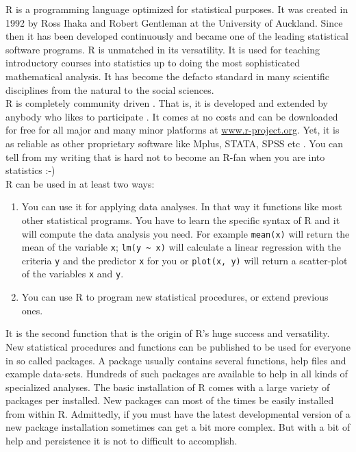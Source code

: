\documentclass[
  letterpaper,
  DIV=11,
  numbers=noendperiod]{scrreprt}
\providecommand{\tightlist}{%
  \setlength{\itemsep}{0pt}\setlength{\parskip}{0pt}}\usepackage{longtable,booktabs,array}
\begin{document}
R is a programming language optimized for statistical purposes. It was
created in 1992 by Ross Ihaka and Robert Gentleman at the University of
Auckland. Since then it has been developed continuously and became one
of the leading statistical software programs. R is unmatched in its
versatility. It is used for teaching introductory courses into
statistics up to doing the most sophisticated mathematical analysis. It
has become the defacto standard in many scientific disciplines from the
natural to the social sciences.\\
R is completely community driven . That is, it is developed and extended
by anybody who likes to participate . It comes at no costs and can be
downloaded for free for all major and many minor platforms at
\href{http://www.r-project.org}{www.r-project.org}. Yet, it is as
reliable as other proprietary software like Mplus, STATA, SPSS etc . You
can tell from my writing that is hard not to become an R-fan when you
are into statistics :-)\\
R can be used in at least two ways:

\begin{enumerate}
\def\labelenumi{\arabic{enumi}.}
\tightlist
\item
  You can use it for applying data analyses. In that way it functions
  like most other statistical programs. You have to learn the specific
  syntax of R and it will compute the data analysis you need. For
  example \texttt{mean(x)} will return the mean of the variable
  \texttt{x}; \texttt{lm(y\ \textasciitilde{}\ x)} will calculate a
  linear regression with the criteria \texttt{y} and the predictor
  \texttt{x} for you or \texttt{plot(x,\ y)} will return a scatter-plot
  of the variables \texttt{x} and \texttt{y}.
\item
  You can use R to program new statistical procedures, or extend
  previous ones.
\end{enumerate}

It is the second function that is the origin of R's huge success and
versatility. New statistical procedures and functions can be published
to be used for everyone in so called packages. A package usually
contains several functions, help files and example data-sets. Hundreds
of such packages are available to help in all kinds of specialized
analyses. The basic installation of R comes with a large variety of
packages per installed. New packages can most of the times be easily
installed from within R. Admittedly, if you must have the latest
developmental version of a new package installation sometimes can get a
bit more complex. But with a bit of help and persistence it is not to
difficult to accomplish.
\end{document}
